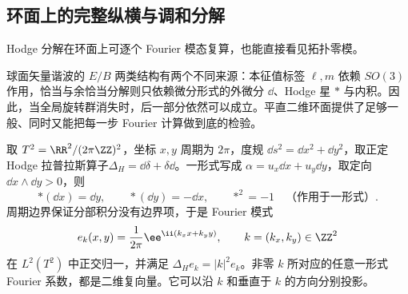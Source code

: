 \subsection{环面上的完整纵横与调和分解}

Hodge 分解在环面上可逐个 Fourier 模态复算，也能直接看见拓扑零模。

球面矢量谐波的 $E/B$ 两类结构有两个不同来源：本征值标签 $\ell,m$ 依赖 $SO(3)$ 作用，恰当与余恰当分解则只依赖微分形式的外微分 $\dd$、Hodge 星 $*$ 与内积。因此，当全局旋转群消失时，后一部分依然可以成立。平直二维环面提供了足够一般、同时又能把每一步 Fourier 计算做到底的检验。

取 $T^2=\RR^2/(2\pi\ZZ)^2$，坐标 $x,y$ 周期为 $2\pi$，度规 $\dd s^2=\dd x^2+\dd y^2$，取正定 Hodge 拉普拉斯算子$\Delta_H=\dd\delta+\delta\dd$。一形式写成 $\alpha=u_x\dd x+u_y\dd y$，取定向 $\dd x\wedge\dd y>0$，则
\begin{equation}\label{eq:ghs-r9-torus-star}
 *(\dd x)=\dd y,\qquad *(\dd y)=-\dd x,
 \qquad *^2=-1\quad\text{（作用于一形式）}.
\end{equation}
周期边界保证分部积分没有边界项，于是 Fourier 模式
\[
 e_k(x,y)=\frac1{2\pi}\ee^{\ii(k_xx+k_yy)},\qquad
 k=(k_x,k_y)\in\ZZ^2
\]
在 $L^2(T^2)$ 中正交归一，并满足 $\Delta_He_k=|k|^2e_k$。非零 $k$ 所对应的任意一形式 Fourier 系数，都是二维复向量。它可以沿 $k$ 和垂直于 $k$ 的方向分别投影。

